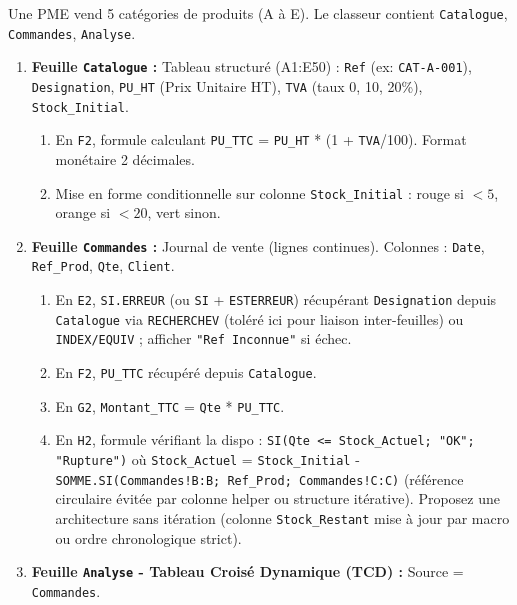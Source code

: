 \documentclass[11pt]{article}
\begin{document}
\begin{exercice}
Une PME vend 5 catégories de produits (A à E). Le classeur contient \texttt{Catalogue}, \texttt{Commandes}, \texttt{Analyse}.
\begin{enumerate}
    \item \textbf{Feuille \texttt{Catalogue} :} Tableau structuré (A1:E50) : \texttt{Ref} (ex: \texttt{CAT-A-001}), \texttt{Designation}, \texttt{PU\_HT} (Prix Unitaire HT), \texttt{TVA} (taux 0, 10, 20\%), \texttt{Stock\_Initial}. 
    \begin{enumerate}
        \item En \texttt{F2}, formule calculant \texttt{PU\_TTC} = \texttt{PU\_HT} * (1 + \texttt{TVA}/100). Format monétaire 2 décimales.
        \item Mise en forme conditionnelle sur colonne \texttt{Stock\_Initial} : rouge si $< 5$, orange si $< 20$, vert sinon.
    \end{enumerate}
    \item \textbf{Feuille \texttt{Commandes} :} Journal de vente (lignes continues). Colonnes : \texttt{Date}, \texttt{Ref\_Prod}, \texttt{Qte}, \texttt{Client}. 
    \begin{enumerate}
        \item En \texttt{E2}, \texttt{SI.ERREUR} (ou \texttt{SI} + \texttt{ESTERREUR}) récupérant \texttt{Designation} depuis \texttt{Catalogue} via \texttt{RECHERCHEV} (toléré ici pour liaison inter-feuilles) ou \texttt{INDEX/EQUIV} ; afficher \texttt{"Ref Inconnue"} si échec.
        \item En \texttt{F2}, \texttt{PU\_TTC} récupéré depuis \texttt{Catalogue}.
        \item En \texttt{G2}, \texttt{Montant\_TTC} = \texttt{Qte} * \texttt{PU\_TTC}.
        \item En \texttt{H2}, formule vérifiant la dispo : \texttt{SI(Qte <= Stock\_Actuel; "OK"; "Rupture")} où \texttt{Stock\_Actuel} = \texttt{Stock\_Initial} - \texttt{SOMME.SI(Commandes!B:B; Ref\_Prod; Commandes!C:C)} (référence circulaire évitée par colonne helper ou structure itérative). Proposez une architecture sans itération (colonne \texttt{Stock\_Restant} mise à jour par macro ou ordre chronologique strict).
    \end{enumerate}
    \item \textbf{Feuille \texttt{Analyse} - Tableau Croisé Dynamique (TCD) :} Source = \texttt{Commandes}.
    \begin{enumerate}

\end{enumerate}
\end{enumerate}
\end{exercice}
\end{document}

